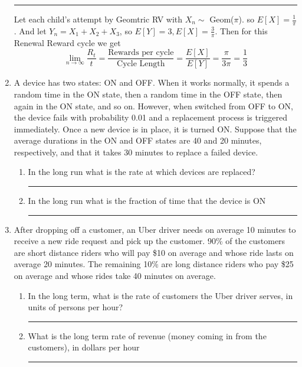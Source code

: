 \documentclass{article} %
\theoremstyle{plain}
\theoremstyle{case}
\begin{document}
\begin{enumerate}[label={\fbox{\textbf{Exercise \#\arabic* :}}}]
\par\noindent\rule{\textwidth}{0.1pt}
      Let each child's attempt by Geomtric RV with $X_n \sim $ Geom($\pi$).
    so $E[X] = \frac{1}{\pi}$.
    And let $Y_n = X_1 + X_2 + X_3$, so $E[Y] = 3, E[X] = \frac{3}{\pi}$. 
    Then for this Renewal Reward cycle we get
    \[ \lim_{n \to \infty} \frac{R_t}{t} =
        \frac{\text{Rewards per cycle}}{\text{Cycle Length}}
        = \frac{E[X]}{E[Y]}
        = \frac{\pi}{3 \pi} = \frac{1}{3}   \]
  \newpage
  \item A device has two states: ON and OFF. When it works normally, it
    spends a random time in the ON state, then a random time in the OFF
    state, then again in the ON state, and so on. However, when switched
    from OFF to ON, the device fails with probability 0.01 and a
    replacement process is triggered immediately. Once a new device is in
    place, it is turned ON. Suppose that the average durations in the ON
    and OFF states are 40 and 20 minutes, respectively, and that it takes
    30 minutes to replace a failed device.
    \begin{enumerate}
      \item In the long run what is the rate at which devices are replaced?
\par\noindent\rule{\textwidth}{0.1pt}
      \item In the long run what is the fraction of time that the device is ON
\par\noindent\rule{\textwidth}{0.1pt}
    \end{enumerate}
  \newpage
  \item After dropping off a customer, an Uber driver needs on average 10
    minutes to receive a new ride request and pick up the customer.
    90\% of the customers are short distance riders who will pay
    \$10 on average and whose ride lasts on average 20 minutes.
    The remaining 10\% are long distance riders who pay \$25 on
    average and whose rides take 40 minutes on average.
    \begin{enumerate}
      \item In the long term, what is the rate of customers the Uber driver serves, in units of persons per hour?
\par\noindent\rule{\textwidth}{0.1pt}
      \item What is the long term rate of revenue (money coming in from the customers), in dollars per hour
\par\noindent\rule{\textwidth}{0.1pt}
    \end{enumerate}


\end{enumerate}
\end{document}
